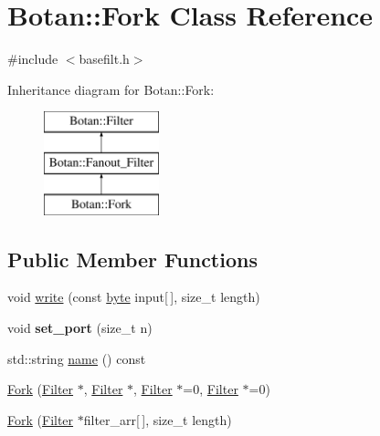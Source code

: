 \hypertarget{classBotan_1_1Fork}{\section{Botan\-:\-:Fork Class Reference}
\label{classBotan_1_1Fork}
}


{\ttfamily \#include $<$basefilt.\-h$>$}

Inheritance diagram for Botan\-:\-:Fork\-:\begin{figure}[H]
\begin{center}
\leavevmode
\includegraphics[height=3.000000cm]{classBotan_1_1Fork}
\end{center}
\end{figure}
\subsection*{Public Member Functions}
\begin{DoxyCompactItemize}
\item 
void \hyperlink{classBotan_1_1Fork_a1fc14566d995c5091e15d7a34b8599a6}{write} (const \hyperlink{namespaceBotan_a7d793989d801281df48c6b19616b8b84}{byte} input\mbox{[}$\,$\mbox{]}, size\-\_\-t length)
\item 
\hypertarget{classBotan_1_1Fork_a7c6120eb0215f24171535b5b36a4d4d1}{void {\bfseries set\-\_\-port} (size\-\_\-t n)}\label{classBotan_1_1Fork_a7c6120eb0215f24171535b5b36a4d4d1}

\item 
std\-::string \hyperlink{classBotan_1_1Fork_a5e8f7af910dcb73acc9d7d23850d4ed1}{name} () const 
\item 
\hyperlink{classBotan_1_1Fork_ad53bacd5c1bd2de8692a5d00d4234f09}{Fork} (\hyperlink{classBotan_1_1Filter}{Filter} $\ast$, \hyperlink{classBotan_1_1Filter}{Filter} $\ast$, \hyperlink{classBotan_1_1Filter}{Filter} $\ast$=0, \hyperlink{classBotan_1_1Filter}{Filter} $\ast$=0)
\item 
\hyperlink{classBotan_1_1Fork_ad64de85573cd7dd511d12eacfb560761}{Fork} (\hyperlink{classBotan_1_1Filter}{Filter} $\ast$filter\-\_\-arr\mbox{[}$\,$\mbox{]}, size\-\_\-t length)
\end{DoxyCompactItemize}
